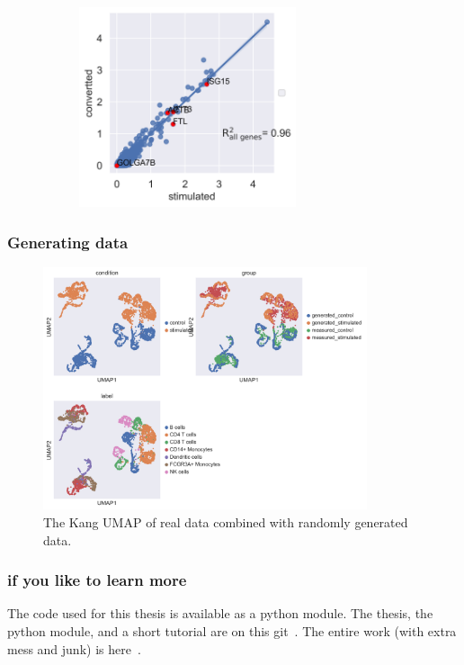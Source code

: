 \documentclass[final]{beamer}
\theoremstyle{plain}
\theoremstyle{definition}
\theoremstyle{remark}
\begin{document}
\begin{frame}
\begin{figure}[h]
\begin{subfigure}[b]{0.49\textwidth}
\includegraphics[width=0.7\textwidth]{images/Kang_bcells_stimulated_converted.png}
\label{fig:Kang_bcells_stimulated_converted}
\end{subfigure}
\end{figure}
\end{frame}

\begin{frame}
\frametitle{Generating data}
\begin{figure}[h]
\centering
\includegraphics[width=0.85\textwidth]{images/Kang_generated_data.png}
\caption{
The Kang UMAP of real data combined with randomly generated data.
}
\label{fig:Kang_generated_data}
\end{figure}
\end{frame}

\begin{frame}
\frametitle{if you like to learn more}
The code used for this thesis is available as a python module.
The thesis, the python module, and a short tutorial are on this git~\cite{mpgvaeRepo}.
The entire work (with extra mess and junk) is here~\cite{mg22Repo}.
\end{frame}
\end{document}
